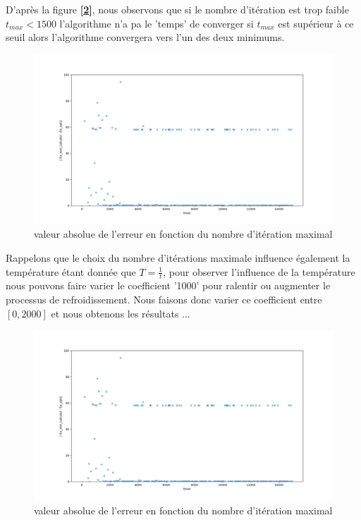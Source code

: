\documentclass[12pt]{article}
\begin{document}
\begin{minipage}{0.5\textwidth}
D'après la figure \textbf{[\ref{Q1_T}]}, nous observons que si le nombre d'itération est trop faible $t_{max}<1500$ l'algorithme n'a pa le 'temps' de converger si $t_{max}$ est supérieur à ce seuil alors l'algorithme convergera vers l'un des deux minimums.
\end{minipage} \hfill
\begin{minipage}{0.45\textwidth}
\begin{figure}[H]
\includegraphics[width=1\textwidth]{Q1_T.png}
\caption{valeur absolue de l'erreur en fonction du nombre d'itération maximal}
\label{Q1_T}
\end{figure}
\end{minipage}



\begin{minipage}{0.5\textwidth}
Rappelons que le choix du nombre d'itérations maximale influence également la température étant donnée que $T=\frac{1}{t}$, pour observer l'influence de la température nous pouvons faire varier le coefficient  '1000' pour ralentir ou augmenter le processus de refroidissement. Nous faisons donc varier ce coefficient entre $[0,2000]$ et nous obtenons les résultats ...
\end{minipage} \hfill
\begin{minipage}{0.45\textwidth}
\begin{figure}[H]
\includegraphics[width=1\textwidth]{Q1_T.png}
\caption{valeur absolue de l'erreur en fonction du nombre d'itération maximal}
\label{Q1_T}
\end{figure}
\end{minipage}
\end{document}

